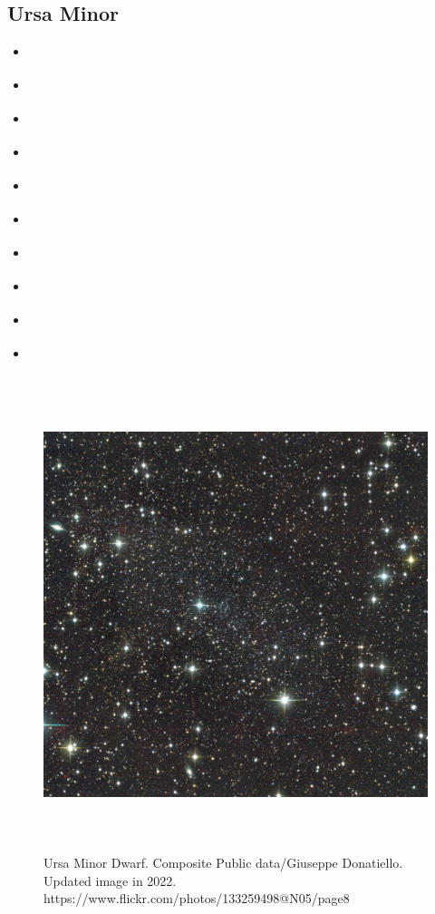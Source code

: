 \subsection{Ursa Minor}\label{ursa-minor}

\begin{itemize}
\item
  \citet{sestito+2023b}
\item
  \citet{pace+2020}
\item
  \citet{bellazzini+2002}
\item
  \citet{hargreaves+1994}
\item
  \citet{martinez-delgado+2001}
\item
  \citet{munoz+2005}
\item
  \citet{pace+2020}
\item
  \citet{palma+2003}
\item
  \citet{spencer+2018}
\item
  \citet{vitral+2023}
\end{itemize}

\begin{figure}
\centering
\includegraphics[width=5.41667in,height=5.41667in]{figures/umi_image.jpg}
\caption[Picture of Ursa Minor]{Ursa Minor Dwarf. Composite Public
data/Giuseppe Donatiello. Updated image in 2022.
https://www.flickr.com/photos/133259498@N05/page8}\label{fig:umi_image}
\end{figure}

